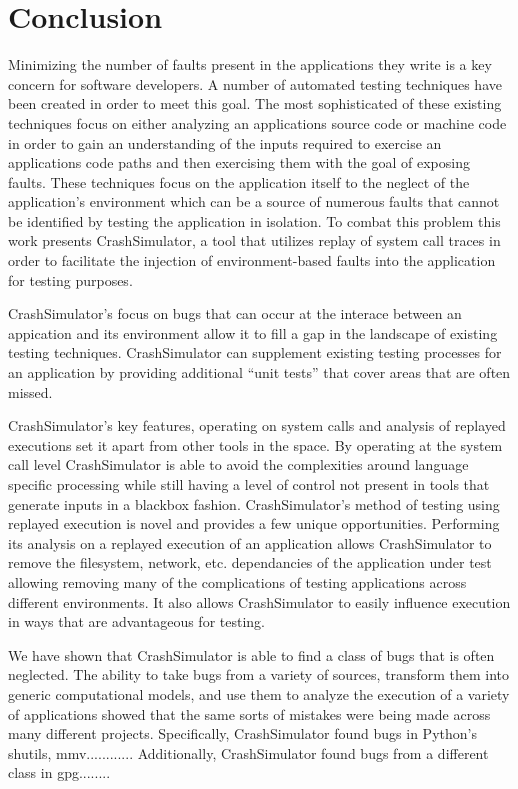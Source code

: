 \section{Conclusion}

Minimizing the number of faults present in the applications they write is a key concern for software developers.  A
number of automated testing techniques have been created in order to meet this goal.  The most sophisticated of these
existing techniques focus on either analyzing an applications source code or machine code in order to gain an
understanding of the inputs required to exercise an applications code paths and then exercising them with the goal of
exposing faults.  These techniques focus on the application itself to the neglect of the application's environment which
can be a source of numerous faults that cannot be identified by testing the application in isolation.  To combat this
problem this work presents CrashSimulator, a tool that utilizes replay of system call traces in order to facilitate the
injection of environment-based faults into the application for testing purposes.

CrashSimulator's focus on bugs that can occur at the interace between an appication and its environment allow it to fill
a gap in the landscape of existing testing techniques.  CrashSimulator can supplement existing testing processes for an
application by providing additional ``unit tests'' that cover areas that are often missed.

CrashSimulator's key features, operating on system calls and analysis of replayed executions set it apart from other
tools in the space.  By operating at the system call level CrashSimulator is able to avoid the complexities around
language specific processing while still having a level of control not present in tools that generate inputs in a
blackbox fashion.  CrashSimulator's method of testing using replayed execution is novel and provides a few unique
opportunities.  Performing its analysis on a replayed execution of an application allows CrashSimulator to remove the
filesystem, network, etc. dependancies of the application under test allowing removing many of the complications of
testing applications across different environments.  It also allows CrashSimulator to easily influence execution in ways
that are advantageous for testing.

We have shown that CrashSimulator is able to find a class of bugs that is often neglected.  The ability to take bugs
from a variety of sources, transform them into generic computational models, and use them to analyze the execution of a
variety of applications showed that the same sorts of mistakes were being made across many different projects.
Specifically, CrashSimulator found bugs in Python's shutils, mmv............ Additionally, CrashSimulator found bugs
from a different class in gpg........
